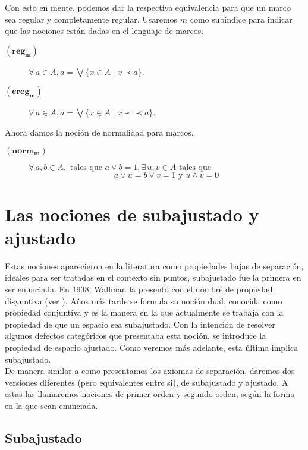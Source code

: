\documentclass{comunicaciones}
\begin{document}
Con esto en mente, podemos dar la respectiva equivalencia para que un marco sea regular y completamente regular.  Usaremos $m$ como subíndice para indicar que las nociones están dadas en el lenguaje de marcos.

\begin{description}
\item[$(\mathbf{reg_m})$] $\forall\, a\in A, a=\bigvee\{x\in A\mid x\prec a\}$.
\item[$(\mathbf{creg_m})$] $\forall\, a\in A, a=\bigvee\{x\in A\mid x\prec \prec a\}$.
\end{description}

Ahora damos la noción de normalidad para marcos.

\begin{description}
\item[$(\mathbf{norm_m})$] $\forall\, a, b\in A, \mbox{ tales que } a\vee b=1, \exists\, u, v\in A\mbox{ tales que }$
\[
 a\vee u=b\vee v=1 \mbox{ y } u\wedge v=0
\]
\end{description}

\section{Las nociones de subajustado y ajustado}

Estas nociones aparecieron en la literatura como propiedades bajas de separación, ideales para ser tratadas en el contexto sin puntos, subajustado fue la primera en ser enunciada. En 1938, Wallman la presento con el nombre de propiedad disyuntiva (ver \cite{H.W.}). Años más tarde se formula su noción dual, conocida como propiedad conjuntiva y es la manera en la que actualmente se trabaja con la propiedad de que un espacio sea subajustado. Con la intención de resolver algunos defectos categóricos que presentaba esta noción, se introduce la propiedad de espacio ajustado. Como veremos más adelante, esta última implica subajustado.\\

De manera similar a como presentamos los axiomas de separación, daremos dos versiones diferentes (pero equivalentes entre si), de subajustado y ajustado. A estas las llamaremos nociones de primer orden y segundo orden, según la forma en la que sean enunciada. 

\subsection{Subajustado}
\end{document}
